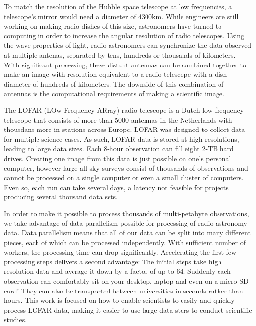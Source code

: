 To match the resolution of the Hubble space telescope at low frequencies, a telescope's mirror would need a diameter of 4300km. While engineers are still working on making radio dishes of this size, astronomers have turned to computing in order to increase the angular resolution of radio telescopes. Using the wave properties of light, radio astronomers can synchronize the data observed at multiple antenas, separated by tens, hundreds or thousands of kilometers. With significant processing, these distant antennas can be combined together to make an image with resolution equivalent to a radio telescope with a dish diameter of hundreds of kilometers. The downside of this combination of antennas is the computational requirements of making a scientific image. 

The LOFAR (LOw-Frequency-ARray) radio telescope is a Dutch low-frequency telescope that consists of more than 5000 antennas in the Netherlands with thousdans more in stations across Europe. LOFAR was designed to collect data for multiple science cases. As such, LOFAR data is stored at high resolutions, leading to large data sizes. Each 8-hour observation can fill eight 2-TB hard drives. Creating one image from this data is just possible on one's personal computer, however large all-sky surveys consist of thousands of observations and cannot be processed on a single computer or even a small cluster of computers. Even so, each run can take several days, a latency not feasible for projects producing several thousand data sets.

In order to make it possible to process thousands of multi-petabyte observations, we take advantage of data parallelism possible for processing of radio astronomy data. Data parallelism means that all of our data can be split into many different pieces, each of which can be processed independently. With sufficient number of workers, the processing time can drop significantly. Accelerating the first few processing steps delivers a second advantage: The initial steps take high resolution data and average it down by a factor of up to 64. Suddenly each observation can comfortably sit on your desktop, laptop and even on a micro-SD card! They can also be transported between universities in seconds rather than hours. This work is focused on how to enable scientists to easily and quickly process LOFAR data, making it easier to use large data sters to conduct scientific studies.

